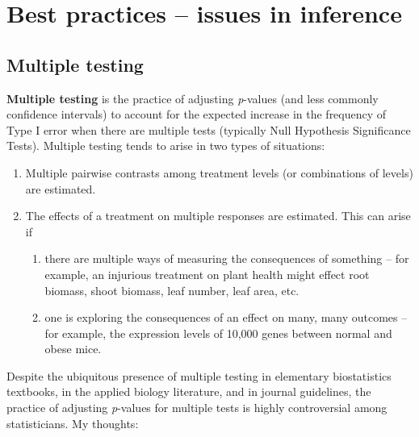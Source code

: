 \documentclass[]{book}
\providecommand{\tightlist}{%
  \setlength{\itemsep}{0pt}\setlength{\parskip}{0pt}}
\begin{document}
\hypertarget{best-practices-issues-in-inference}{%
\chapter{Best practices -- issues in inference}\label{best-practices-issues-in-inference}}

\hypertarget{multiple-testing}{%
\section{Multiple testing}\label{multiple-testing}}

\textbf{Multiple testing} is the practice of adjusting \emph{p}-values (and less commonly confidence intervals) to account for the expected increase in the frequency of Type I error when there are multiple tests (typically Null Hypothesis Significance Tests). Multiple testing tends to arise in two types of situations:

\begin{enumerate}
\def\labelenumi{\arabic{enumi}.}
\tightlist
\item
  Multiple pairwise contrasts among treatment levels (or combinations of levels) are estimated.
\item
  The effects of a treatment on multiple responses are estimated. This can arise if

  \begin{enumerate}
  \def\labelenumii{\alph{enumii}.}
  \tightlist
  \item
    there are multiple ways of measuring the consequences of something -- for example, an injurious treatment on plant health might effect root biomass, shoot biomass, leaf number, leaf area, etc.
  \item
    one is exploring the consequences of an effect on many, many outcomes -- for example, the expression levels of 10,000 genes between normal and obese mice.
  \end{enumerate}
\end{enumerate}

Despite the ubiquitous presence of multiple testing in elementary biostatistics textbooks, in the applied biology literature, and in journal guidelines, the practice of adjusting \emph{p}-values for multiple tests is highly controversial among statisticians. My thoughts:
\end{document}
